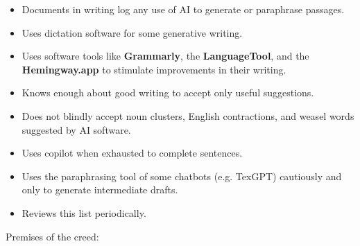 \documentclass[11pt,letterpaper]{article}
\begin{document}
\begin{itemize}
\item Documents in writing log any use of AI to generate or paraphrase passages.
\item Uses dictation software for some generative writing.
\item Uses software tools like \textbf{Grammarly}, the \textbf{LanguageTool}, and the \textbf{Hemingway.app} to stimulate improvements in their writing.
\item Knows enough about good writing to accept only useful suggestions.
\item Does not blindly accept noun clusters, English contractions, and weasel words suggested by AI software.
\item Uses copilot when exhausted to complete sentences.
\item Uses the paraphrasing tool of some chatbots (e.g. TexGPT) cautiously and only to generate intermediate drafts.
\item Reviews this list periodically.
\end{itemize}

Premises of the creed:
\end{document}
